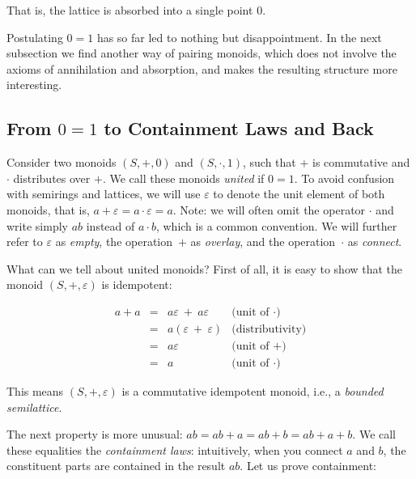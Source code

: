 \documentclass[crc,english]{programming}
\begin{document}
\noindent
That is, the lattice is absorbed into a single point $0$.

Postulating $0 = 1$ has so far led to nothing but disappointment. In the
next subsection we find another way of pairing monoids, which does not involve
the axioms of annihilation and absorption, and makes the resulting structure
more interesting.

\subsection{From $0=1$ to Containment Laws and Back}

Consider two monoids $(S, +, 0)$ and $(S, \cdot, 1)$, such that $+$ is
commutative and $\cdot$ distributes over $+$. We call these monoids
\emph{united} if $0 = 1$. To avoid confusion with semirings and lattices, we
will use $\varepsilon$ to denote the unit element of both monoids, that is,
$a + \varepsilon = a \cdot \varepsilon = a$. Note: we will often omit the
operator $\cdot$ and write simply $\textit{ab}$ instead of $a \cdot b$, which is
a common convention. We will further refer to $\varepsilon$ as \emph{empty}, the
operation~$+$ as \emph{overlay}, and the operation~$\cdot$ as \emph{connect}.

What can we tell about united monoids? First of all, it is easy to show that the
monoid $(S, +, \varepsilon)$ is idempotent:

\vspace{-5mm}
\begin{equation*}
\begin{array}{rcll}
a + a & = & a\varepsilon\ +\ a\varepsilon & \text{(unit of $\cdot$)}\\
 & = & a(\varepsilon\ +\ \varepsilon) & \text{(distributivity)}\\
 & = & a\varepsilon & \text{(unit of $+$)}\\
 & = & a & \text{(unit of $\cdot$)}
\end{array}
\end{equation*}
\vspace{-3mm}

\noindent
This means $(S, +, \varepsilon)$ is a commutative idempotent monoid, i.e.,
a \emph{bounded semilattice}.

The next property is more unusual:
$\textit{ab} = \textit{ab} + a = \textit{ab} + b = \textit{ab} + a + b$. We
call these equalities the \emph{containment laws}: intuitively, when you
connect $a$ and $b$, the constituent parts are contained in the result
$\textit{ab}$. Let us prove containment:
\end{document}
